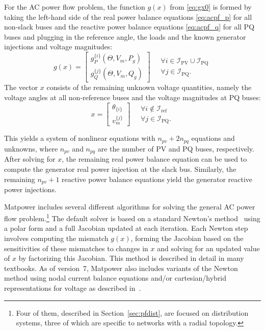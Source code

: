 \documentclass[12pt]{article}
\newcommand{\matpower}[0]{{\sc Matpower}}
\numberwithin{equation}{section}
\numberwithin{table}{section}
\numberwithin{figure}{section}
\begin{document}
For the AC power flow problem, the function $g(x)$ from \eqref{eq:gx0} is formed by taking the left-hand side of the real power balance equations \eqref{eq:acpf_p} for all non-slack buses and the reactive power balance equations \eqref{eq:acpf_q} for all PQ buses and plugging in the reference angle, the loads and the known generator injections and voltage magnitudes:
\begin{equation}
g(x) = \left[\begin{array}{c}
g_P^{\{i\}}(\Theta, V_m, P_g) \\
g_Q^{\{j\}}(\Theta, V_m, Q_g)
\end{array}\right] \quad
\begin{array}{l}
\forall i \in \mathcal{I}_\mathrm{PV} \cup \mathcal{I}_\mathrm{PQ} \\
\forall j \in \mathcal{I}_\mathrm{PQ}.
\end{array}
\label{eq:g_acpf}
\end{equation}
The vector $x$ consists of the remaining unknown voltage quantities, namely the voltage angles at all non-reference buses and the voltage magnitudes at PQ buses:
\begin{equation}
x = \left[\begin{array}{c}
\theta_{\{i\}} \\
v_m^{\{j\}}
\end{array}\right] \quad
\begin{array}{l}
\forall i \notin \mathcal{I}_\mathrm{ref} \\
\forall j \in \mathcal{I}_\mathrm{PQ}.
\end{array}
\label{eq:x_acpf}
\end{equation}

This yields a system of nonlinear equations with $n_{pv} + 2n_{pq}$ equations and unknowns, where $n_{pv}$ and $n_{pq}$ are the number of PV and PQ buses, respectively. After solving for $x$, the remaining real power balance equation can be used to compute the generator real power injection at the slack bus. Similarly, the remaining $n_{pv} + 1$ reactive power balance equations yield the generator reactive power injections.

\matpower{} includes several different algorithms for solving the general AC power flow problem.\footnote{Four of them, described in Section~\ref{sec:pfdist}, are focused on distribution systems, three of which are specific to networks with a radial topology.} The default solver is based on a standard Newton's method~\cite{tinney1967} using a polar form and a full Jacobian updated at each iteration. Each Newton step involves computing the mismatch $g(x)$, forming the Jacobian based on the sensitivities of these mismatches to changes in $x$ and solving for an updated value of $x$ by factorizing this Jacobian. This method is described in detail in many textbooks. As of version~7, \matpower{} also includes variants of the Newton method using nodal current balance equations and/or cartesian/hybrid representations for voltage as described in~\cite{sereeter2019}.
\end{document}

